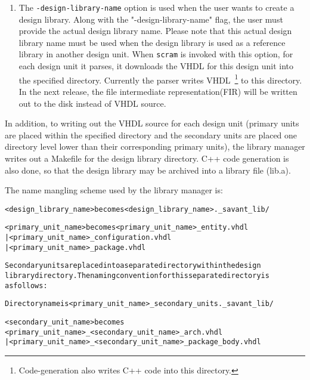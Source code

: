 \documentclass[11pt]{report}
\begin{document}
\begin{enumerate}

\item
The \texttt{-design-library-name} option is used when the user wants to
create a design library.  Along with the "-design-library-name" flag, the
user must provide the actual design library name.  Please note that this
actual design library name must be used when the design library is used as
a reference library in another design unit.  When \texttt{scram} is
invoked with this option, for each design unit it parses, it downloads the
VHDL for this design unit into the specified directory.  Currently the
parser writes VHDL~\footnote{Code-generation also writes C++ code into
this directory.} to this directory.  In the next release, the file
intermediate representation(FIR) will be written out to the disk instead
of VHDL source.

\end{enumerate}

In addition, to writing out the VHDL source for each design unit (primary
units are placed within the specified directory and the secondary units
are placed one directory level lower than their corresponding primary
units), the library manager writes out a Makefile for the design library
directory.  C++ code generation is also done, so that the design library
may be archived into a library file (lib.a).

The name mangling scheme used by the library manager is:

\begin{alltt}

<design\_library\_name> becomes <design\_library\_name>.\_savant\_lib/

<primary\_unit\_name> becomes   <primary\_unit\_name>\_entity.vhdl 
                            | <primary\_unit\_name>\_configuration.vhdl 
                            | <primary\_unit\_name>\_package.vhdl

Secondary units are placed into a separate directory within the design
library directory.  The naming convention for this separate directory is
as follows :

Directory name is <primary\_unit\_name>\_secondary\_units.\_savant\_lib/

<secondary\_unit\_name> becomes 
          <primary\_unit\_name>\_<secondary\_unit\_name>\_arch.vhdl
        | <primary\_unit\_name>\_<secondary\_unit\_name>\_package\_body.vhdl
\end{alltt}
\end{document}
